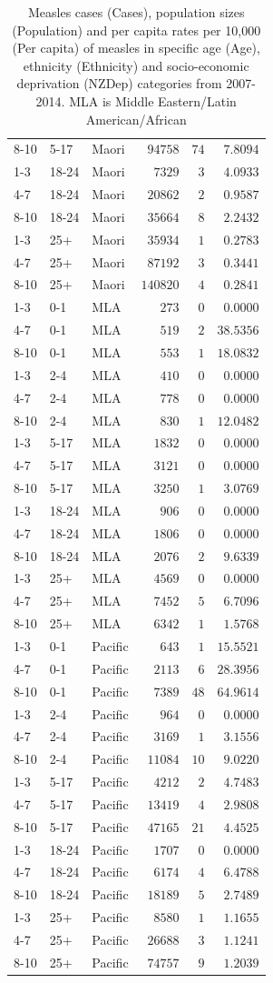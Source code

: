 \documentclass{article}
\begin{document}
\begin{table}[hbtp]
\begin{center}
\begin{tabular}{lllrrr}
8-10&5-17&Maori&$ 94758$&$ 74$&$ 7.8094$\tabularnewline
1-3&18-24&Maori&$  7329$&$  3$&$ 4.0933$\tabularnewline
4-7&18-24&Maori&$ 20862$&$  2$&$ 0.9587$\tabularnewline
8-10&18-24&Maori&$ 35664$&$  8$&$ 2.2432$\tabularnewline
1-3&25+&Maori&$ 35934$&$  1$&$ 0.2783$\tabularnewline
4-7&25+&Maori&$ 87192$&$  3$&$ 0.3441$\tabularnewline
8-10&25+&Maori&$140820$&$  4$&$ 0.2841$\tabularnewline
1-3&0-1&MLA&$   273$&$  0$&$ 0.0000$\tabularnewline
4-7&0-1&MLA&$   519$&$  2$&$38.5356$\tabularnewline
8-10&0-1&MLA&$   553$&$  1$&$18.0832$\tabularnewline
1-3&2-4&MLA&$   410$&$  0$&$ 0.0000$\tabularnewline
4-7&2-4&MLA&$   778$&$  0$&$ 0.0000$\tabularnewline
8-10&2-4&MLA&$   830$&$  1$&$12.0482$\tabularnewline
1-3&5-17&MLA&$  1832$&$  0$&$ 0.0000$\tabularnewline
4-7&5-17&MLA&$  3121$&$  0$&$ 0.0000$\tabularnewline
8-10&5-17&MLA&$  3250$&$  1$&$ 3.0769$\tabularnewline
1-3&18-24&MLA&$   906$&$  0$&$ 0.0000$\tabularnewline
4-7&18-24&MLA&$  1806$&$  0$&$ 0.0000$\tabularnewline
8-10&18-24&MLA&$  2076$&$  2$&$ 9.6339$\tabularnewline
1-3&25+&MLA&$  4569$&$  0$&$ 0.0000$\tabularnewline
4-7&25+&MLA&$  7452$&$  5$&$ 6.7096$\tabularnewline
8-10&25+&MLA&$  6342$&$  1$&$ 1.5768$\tabularnewline
1-3&0-1&Pacific&$   643$&$  1$&$15.5521$\tabularnewline
4-7&0-1&Pacific&$  2113$&$  6$&$28.3956$\tabularnewline
8-10&0-1&Pacific&$  7389$&$ 48$&$64.9614$\tabularnewline
1-3&2-4&Pacific&$   964$&$  0$&$ 0.0000$\tabularnewline
4-7&2-4&Pacific&$  3169$&$  1$&$ 3.1556$\tabularnewline
8-10&2-4&Pacific&$ 11084$&$ 10$&$ 9.0220$\tabularnewline
1-3&5-17&Pacific&$  4212$&$  2$&$ 4.7483$\tabularnewline
4-7&5-17&Pacific&$ 13419$&$  4$&$ 2.9808$\tabularnewline
8-10&5-17&Pacific&$ 47165$&$ 21$&$ 4.4525$\tabularnewline
1-3&18-24&Pacific&$  1707$&$  0$&$ 0.0000$\tabularnewline
4-7&18-24&Pacific&$  6174$&$  4$&$ 6.4788$\tabularnewline
8-10&18-24&Pacific&$ 18189$&$  5$&$ 2.7489$\tabularnewline
1-3&25+&Pacific&$  8580$&$  1$&$ 1.1655$\tabularnewline
4-7&25+&Pacific&$ 26688$&$  3$&$ 1.1241$\tabularnewline
8-10&25+&Pacific&$ 74757$&$  9$&$ 1.2039$\tabularnewline
\hline
\end{tabular}\end{center}\caption{Measles cases (Cases), population sizes (Population) and per capita rates per 10,000 (Per capita) of measles in specific age (Age), ethnicity (Ethnicity) and socio-economic deprivation (NZDep) categories from 2007-2014. MLA is Middle Eastern/Latin American/African}
\label{table:percap}
\end{table}

\end{document}
